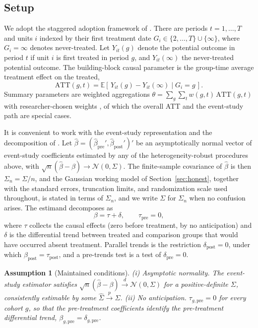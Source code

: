 \documentclass[12pt]{article}
\newtheorem{assumption}{Assumption}
\theoremstyle{remark}
\begin{document}
\subsection{Setup}\label{sec:setup}

We adopt the staggered adoption framework of \citet{callaway2021}. There are periods
$t=1,\dots,T$ and units $i$ indexed by their first treatment date $G_i \in \{2,\dots,T\}\cup\{\infty\}$,
where $G_i=\infty$ denotes never-treated. Let $Y_{it}(g)$ denote the potential outcome in period $t$
if unit $i$ is first treated in period $g$, and $Y_{it}(\infty)$ the never-treated potential outcome.
The building-block causal parameter is the group-time average treatment effect on the treated,
\begin{equation}
\mathrm{ATT}(g,t) = \mathbb{E}\!\left[\,Y_{it}(g)-Y_{it}(\infty)\mid G_i=g\,\right].
\end{equation}
Summary parameters are weighted aggregations $\theta = \sum_{g}\sum_t w(g,t)\,\mathrm{ATT}(g,t)$ with
researcher-chosen weights \citep{callaway2021}, of which the overall ATT and the event-study path are
special cases.

It is convenient to work with the event-study representation and the decomposition of
\citet{rambachan2023}. Let $\hat\beta=(\hat\beta_{\mathrm{pre}}',\hat\beta_{\mathrm{post}}')'$ be an
asymptotically normal vector of event-study coefficients estimated by any of the heterogeneity-robust
procedures above, with $\sqrt{n}(\hat\beta-\beta)\to\mathcal{N}(0,\Sigma)$. The finite-sample covariance of
$\hat\beta$ is then $\Sigma_n=\Sigma/n$, and the Gaussian working model of Section~\ref{sec:honest},
together with the standard errors, truncation limits, and randomization scale used throughout, is stated in
terms of $\Sigma_n$, and we write $\Sigma$ for $\Sigma_n$ when no confusion arises. The estimand decomposes as
\begin{equation}
\beta = \tau + \delta, \qquad \tau_{\mathrm{pre}}=0,
\label{eq:decomp}
\end{equation}
where $\tau$ collects the causal effects (zero before treatment, by no anticipation) and $\delta$ is
the differential trend between treated and comparison groups that would have occurred absent
treatment. Parallel trends is the restriction $\delta_{\mathrm{post}}=0$, under which
$\beta_{\mathrm{post}}=\tau_{\mathrm{post}}$, and a pre-trends test is a test of $\delta_{\mathrm{pre}}=0$.

\begin{assumption}[Maintained conditions]\label{ass:main}
(i) Asymptotic normality. The event-study estimator satisfies
$\sqrt{n}(\hat\beta-\beta)\xrightarrow{d}\mathcal N(0,\Sigma)$ for a positive-definite $\Sigma$, consistently
estimable by some $\hat\Sigma\xrightarrow{p}\Sigma$. (ii) No anticipation. $\tau_{g,\mathrm{pre}}=0$
for every cohort $g$, so that the pre-treatment coefficients identify the pre-treatment differential trend,
$\beta_{g,\mathrm{pre}}=\delta_{g,\mathrm{pre}}$.
\end{assumption}
\end{document}
